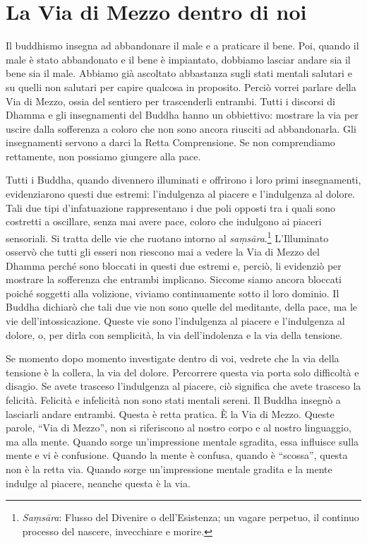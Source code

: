 \chapter{La Via di Mezzo dentro di noi}

Il buddhismo insegna ad abbandonare il male e a praticare il bene. Poi,
quando il male è stato abbandonato e il bene è impiantato, dobbiamo
lasciar andare sia il bene sia il male. Abbiamo già ascoltato abbastanza
sugli stati mentali salutari e su quelli non salutari per capire
qualcosa in proposito. Perciò vorrei parlare della Via di Mezzo, ossia
del sentiero per trascenderli entrambi. Tutti i discorsi di Dhamma e gli
insegnamenti del Buddha hanno un obbiettivo: mostrare la via per uscire
dalla sofferenza a coloro che non sono ancora riusciti ad abbandonarla.
Gli insegnamenti servono a darci la Retta Comprensione. Se non
comprendiamo rettamente, non possiamo giungere alla pace.

Tutti i Buddha, quando divennero illuminati e offrirono i loro primi
insegnamenti, evidenziarono questi due estremi: l'indulgenza al piacere
e l'indulgenza al dolore. Tali due tipi d'infatuazione rappresentano i
due poli opposti tra i quali sono costretti a oscillare, senza mai avere
pace, coloro che indulgono ai piaceri sensoriali. Si tratta delle vie
che ruotano intorno al \emph{saṃsāra}.\footnote{%
  \emph{Saṃsāra}: Flusso del Divenire o dell'Esistenza; un vagare
  perpetuo, il continuo processo del nascere, invecchiare e morire.}
L'Illuminato osservò che tutti gli esseri non riescono
mai a vedere la Via di Mezzo del Dhamma perché sono bloccati in questi
due estremi e, perciò, li evidenziò per mostrare la sofferenza che
entrambi implicano. Siccome siamo ancora bloccati poiché soggetti alla
volizione, viviamo continuamente sotto il loro dominio. Il Buddha
dichiarò che tali due vie non sono quelle del meditante, della pace, ma
le vie dell'intossicazione. Queste vie sono l'indulgenza al piacere e
l'indulgenza al dolore, o, per dirla con semplicità, la via
dell'indolenza e la via della tensione.

Se momento dopo momento investigate dentro di voi, vedrete che la via
della tensione è la collera, la via del dolore. Percorrere questa via
porta solo difficoltà e disagio. Se avete trasceso l'indulgenza al
piacere, ciò significa che avete trasceso la felicità. Felicità e
infelicità non sono stati mentali sereni. Il Buddha insegnò a lasciarli
andare entrambi. Questa è retta pratica. È la Via di Mezzo. Queste
parole, ``Via di Mezzo'', non si riferiscono al nostro corpo e al nostro
linguaggio, ma alla mente. Quando sorge un'impressione mentale sgradita,
essa influisce sulla mente e vi è confusione. Quando la mente è confusa,
quando è ``scossa'', questa non è la retta via. Quando sorge
un'impressione mentale gradita e la mente indulge al piacere, neanche
questa è la via.

